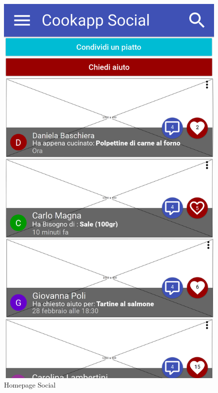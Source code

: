 \begin{figure}[H]
	\begin{minipage}{.49\textwidth}
		\includegraphics[width=\textwidth]{img/wireframe/homepage_social.png}
		\caption{Homepage Social}
		\label{fig:homepage_social}
	\end{minipage}
	\hfill
	\begin{minipage}{.49\textwidth}

\end{minipage}
\end{figure}
